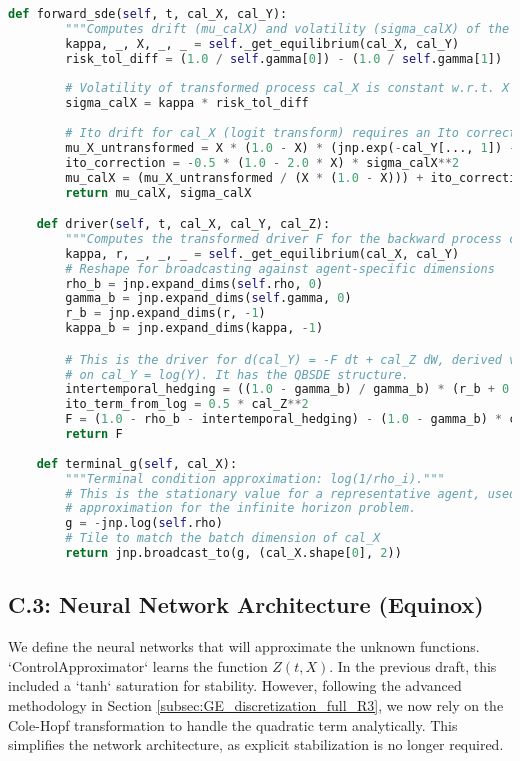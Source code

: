 \documentclass[11pt,letterpaper,oneside]{article}
\theoremstyle{plain}
\theoremstyle{definition}
\theoremstyle{remark}
\begin{document}
\begin{lstlisting}[language=Python, caption={C.2: Transformed Lucas Model FBSDE Coefficients in JAX.}, label={lst:lucas_jax_transformed_app_appendix}]
    def forward_sde(self, t, cal_X, cal_Y):
        """Computes drift (mu_calX) and volatility (sigma_calX) of the transformed forward process."""
        kappa, _, X, _, _ = self._get_equilibrium(cal_X, cal_Y)
        risk_tol_diff = (1.0 / self.gamma[0]) - (1.0 / self.gamma[1])
        
        # Volatility of transformed process cal_X is constant w.r.t. X
        sigma_calX = kappa * risk_tol_diff
        
        # Ito drift for cal_X (logit transform) requires an Ito correction term
        mu_X_untransformed = X * (1.0 - X) * (jnp.exp(-cal_Y[..., 1]) - jnp.exp(-cal_Y[..., 0]))
        ito_correction = -0.5 * (1.0 - 2.0 * X) * sigma_calX**2
        mu_calX = (mu_X_untransformed / (X * (1.0 - X))) + ito_correction
        return mu_calX, sigma_calX

    def driver(self, t, cal_X, cal_Y, cal_Z):
        """Computes the transformed driver F for the backward process cal_Y."""
        kappa, r, _, _, _ = self._get_equilibrium(cal_X, cal_Y)
        # Reshape for broadcasting against agent-specific dimensions
        rho_b = jnp.expand_dims(self.rho, 0)
        gamma_b = jnp.expand_dims(self.gamma, 0)
        r_b = jnp.expand_dims(r, -1)
        kappa_b = jnp.expand_dims(kappa, -1)

        # This is the driver for d(cal_Y) = -F dt + cal_Z dW, derived via Ito's lemma
        # on cal_Y = log(Y). It has the QBSDE structure.
        intertemporal_hedging = ((1.0 - gamma_b) / gamma_b) * (r_b + 0.5 * gamma_b * kappa_b**2)
        ito_term_from_log = 0.5 * cal_Z**2
        F = (1.0 - rho_b - intertemporal_hedging) - (1.0 - gamma_b) * cal_Z * kappa_b + ito_term_from_log
        return F
        
    def terminal_g(self, cal_X):
        """Terminal condition approximation: log(1/rho_i)."""
        # This is the stationary value for a representative agent, used as an
        # approximation for the infinite horizon problem.
        g = -jnp.log(self.rho)
        # Tile to match the batch dimension of cal_X
        return jnp.broadcast_to(g, (cal_X.shape[0], 2))
\end{lstlisting}

\subsection{C.3: Neural Network Architecture (Equinox)}
We define the neural networks that will approximate the unknown functions. `ControlApproximator` learns the function \(Z(t,X)\). In the previous draft, this included a `tanh` saturation for stability. However, following the advanced methodology in Section \ref{subsec:GE_discretization_full_R3}, we now rely on the Cole-Hopf transformation to handle the quadratic term analytically. This simplifies the network architecture, as explicit stabilization is no longer required.
\end{document}
